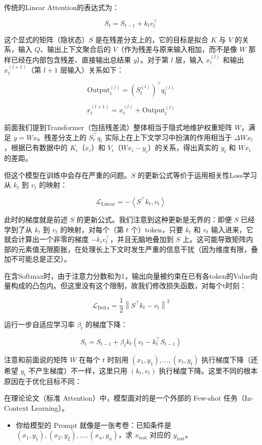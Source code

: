 传统的Linear Attention的表达式为：

\[
S_t=S_{t-1}+k_tv_t^\top
\]

这个显式的矩阵（隐状态）\(S\) 是在残差分支上的，它的目标是拟合 \(K\) 与 \(V\) 的关系，输入 \(Q\)、输出上下文聚合后的 \(V\)（作为残差与原来输入相加，而不是像 \(W\) 那样已经在内部包含残差、直接输出总结果 \(y\)）。对于第 \(l\) 层，输入 \(x_t^{(l)}\) 和输出 \(x_t^{(l+1)}\)（第 \(l+1\) 层输入）关系如下：

\[
\mathrm{Output}_t^{(l)}=\left(S_t^{(l)}\right)^\top q_t^{(l)}
\]

\[
x_t^{(l+1)}=x_t^{(l)}+\mathrm{Output}_t^{(l)}
\]

前面我们提到Transformer（包括残差流）整体相当于隐式地维护权重矩阵 \(W\)，满足 \(y=Wx\)。残差分支上的 \(S_t^\top q_t\) 实际上在上下文学习中扮演的作用相当于 \(\Delta W x_t\)，根据已有数据中的 \(K_i\)（\(x_i\)）和 \(V_i\)（\(Wx_i-y_i\)）的关系，得出真实的 \(y_t\) 和 \(Wx_t\) 的差距。

但这个模型在训练中会存在严重的问题。\(S\) 的更新公式等价于运用相关性Loss学习从 \(k_t\) 到 \(v_t\) 的映射：

\[
\mathcal{L}_{\mathrm{Linear}}=-\left\langle S^\top k_t,v_t\right\rangle
\]

此时的梯度就是前述 \(S\) 的更新公式。我们注意到这种更新是无界的：即便 \(S\) 已经学到了从 \(k_t\) 到 \(v_t\) 的映射，对每个（第 \(t\) 个）token，只要 \(k_t\) 和 \(v_t\) 输入进来，它就会计算出一个非零的梯度 \(-k_tv_t^\top\)，并且无脑地叠加到 \(S\) 上。这可能导致矩阵内部的元素值无限膨胀，在处理长上下文时发生严重的信息干扰（因为维度有限，叠加不可能总是正交）。

在含Softmax时，由于注意力分数和为1，输出向量被约束在已有各token的Value向量构成的凸包内。但这里没有这个限制，故我们修改损失函数，对每个t时刻：

\[
\mathcal{L}_{\mathrm{Delta}}=\frac{1}{2}\left\lVert S^\top k_t-v_t\right\rVert^2
\]

运行一步自适应学习率 \(\beta_t\) 的梯度下降：

\[
S_t=S_{t-1}+\beta_tk_t\left(v_t-k_t^\top S_{t-1}\right)
\]

注意和前面说的矩阵 \(W\) 在每个 \(t\) 时刻用 \((x_1,y_1),\ldots,(x_t,y_t)\) 执行梯度下降（还希望 \(y_t\) 不产生梯度）不一样，这里只用 \((k_t,v_t)\) 执行梯度下降。这里不同的根本原因在于优化目标不同：

在理论论文（标准 Attention）中，模型面对的是一个外部的 Few-shot 任务（In-Context Learning）。

\begin{itemize}
\tightlist
\item
  你给模型的 Prompt 就像是一张考卷：已知条件是 \((x_1,y_1),(x_2,y_2),\ldots,(x_n,y_n)\)，求 \(x_{\mathrm{test}}\) 对应的 \(y_{\mathrm{test}}\)。
\end{itemize}

